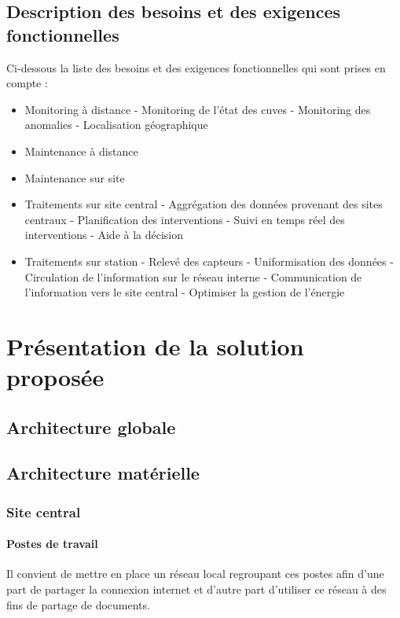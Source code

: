 \documentclass[a4paper]{article}
\begin{document}
\subsection{Description des besoins et des exigences fonctionnelles}

Ci-dessous la liste des besoins et des exigences fonctionnelles qui sont prises en compte :

\begin{itemize}
\item Monitoring à distance - Monitoring de l'état des cuves - Monitoring des anomalies - Localisation géographique
\item Maintenance à distance
\item Maintenance sur site
\item Traitements sur site central - Aggrégation des données provenant des sites centraux - Planification des interventions - Suivi en temps réel des interventions - Aide à la décision
\item Traitements sur station - Relevé des capteurs - Uniformisation des données - Circulation de l'information sur le réseau interne - Communication de l'information vers le site central - Optimiser la gestion de l'énergie
\end{itemize}

\section{Présentation de la solution proposée}

\subsection{Architecture globale}

\subsection{Architecture matérielle}

\subsubsection{Site central}

\paragraph{Postes de travail} Il convient de mettre en place un réseau local regroupant ces postes afin d'une part de partager la connexion internet et d'autre part d'utiliser ce réseau à des fins de partage de documents.
\end{document}
